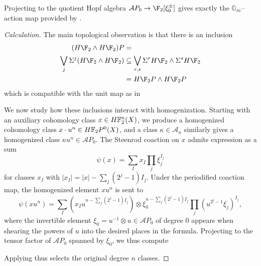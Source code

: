 \begin{lemma}
Projecting to the quotient Hopf algebra \(\mathcal AP_0 \to \F_2[\xi_0^\pm]\) gives exactly the $\mathbb G_m$--action map provided by .
\end{lemma}
\begin{proof}[Calculation]
The main topological observation is that there is an inclusion
\begin{align*}
(H\F_2 \sm H\F_2)P & = \\
\bigvee_j \Susp^j (H\F_2 \sm H\F_2) & \subseteq \bigvee_{r,s} \Susp^r H\F_2 \sm \Susp^s H\F_2 \\
& = H\F_2P \sm H\F_2P
\end{align*}
which is compatible with the unit map as in
\begin{center}
\end{center}
We now study how these inclusions interact with homogenization.  Starting with an auxiliary cohomology class \(x \in \HFtwo^n(X)\), we produce a homogenized cohomology class \(x \cdot u^n \in \HFtwo P^0(X)\), and a class \(\kappa \in \mathcal A_n\) similarly gives a homogenized class \(\kappa u^n \in \mathcal AP_0\).  The Steenrod coaction on \(x\) admits expression as a sum \[\psi(x) = \sum_I x_I \prod_j \xi_j^{I_j}\] for classes \(x_I\) with \(|x_I| = |x| - \sum_j (2^j-1) I_j\).  Under the periodified coaction map, the homogenized element \(x u^n\) is sent to \[\psi(xu^n) = \sum_I \left(x_I u^{n - \sum_j (2^j-1) I_j}\right) \otimes \xi_0^{n - \sum_j (2^j-1) I_j} \prod_j \left(u^{2^j - 1}\xi_j\right)^{I_j},\] where the invertible element \(\xi_0 = u^{-1} \otimes u \in \mathcal AP_0\) of degree $0$ appears when shearing the powers of $u$ into the desired places in the formula.  Projecting to the tensor factor of \(\mathcal AP_0\) spanned by $\xi_0$, we thus compute
\begin{center}
\end{center}
Applying  thus selects the original degree \(n\) classes.
\end{proof}

